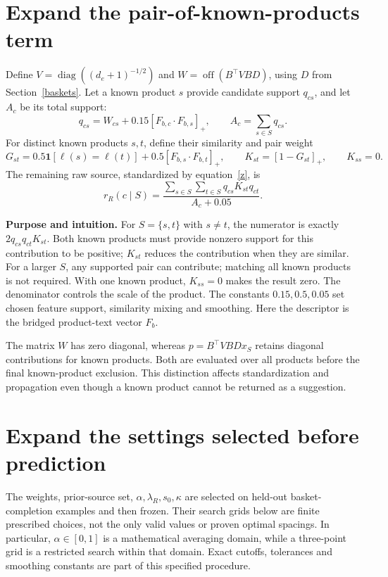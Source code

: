 \documentclass[11pt,a4paper]{article}
\newcommand{\off}{\operatorname{off}}\newcommand{\diag}{\operatorname{diag}}
\newcommand{\why}{\par\textbf{Purpose and intuition.} }
\numberwithin{equation}{section}
\begin{document}
\section{Expand the pair-of-known-products term}\label{agreement}
Define $V=\diag((d_e+1)^{-1/2})$ and $W=\off(B^\top VBD)$, using $D$ from
Section~\ref{baskets}. Let a known product $s$ provide candidate support $q_{cs}$, and let
$A_c$ be its total support:
\begin{equation}
q_{cs}=W_{cs}+0.15[F_{b,c}\cdot F_{b,s}]_+,\qquad A_c=\sum_{s\in S}q_{cs}.
\end{equation}
For distinct known products $s,t$, define their similarity and pair weight
\begin{equation}
G_{st}=0.5\mathbf1[\ell(s)=\ell(t)]+0.5[F_{b,s}\cdot F_{b,t}]_+,
\qquad K_{st}=[1-G_{st}]_+,\qquad K_{ss}=0.
\end{equation}
The remaining raw source, standardized by equation~\eqref{z}, is
\begin{equation}\label{R}
\boxed{r_R(c\mid S)=\frac{\sum_{s\in S}\sum_{t\in S}q_{cs}K_{st}q_{ct}}{A_c+0.05}.}
\end{equation}
\why For $S=\{s,t\}$ with $s\ne t$, the numerator is exactly $2q_{cs}q_{ct}K_{st}$.
Both known products must provide nonzero support for this contribution to be positive;
$K_{st}$ reduces the contribution when they are similar. For a larger $S$, any supported
pair can contribute; matching all known products is not required. With one known product,
$K_{ss}=0$ makes the result zero. The denominator controls the scale of the product.
The constants $0.15,0.5,0.05$ set chosen feature support, similarity mixing and smoothing.
Here the descriptor is the bridged product-text vector $F_b$.

The matrix $W$ has zero diagonal, whereas $p=B^\top VBDx_S$ retains diagonal
contributions for known products. Both are evaluated over all products before the final
known-product exclusion. This distinction affects standardization and propagation even
though a known product cannot be returned as a suggestion.

\section{Expand the settings selected before prediction}\label{settings}
The weights, prior-source set, $\alpha,\lambda_R,s_0,\kappa$ are selected on held-out
basket-completion examples and then frozen. Their search grids below are finite prescribed
choices, not the only valid values or proven optimal spacings. In particular,
$\alpha\in[0,1]$ is a mathematical averaging domain, while a three-point grid is a
restricted search within that domain. Exact cutoffs, tolerances and smoothing constants
are part of this specified procedure.
\end{document}
